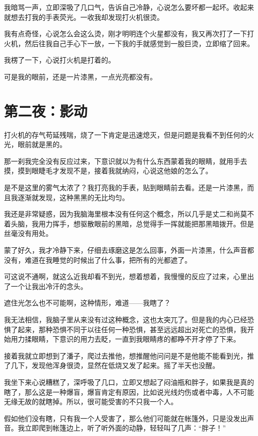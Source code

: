 我暗骂一声，立即深吸了几口气，告诉自己冷静，心说怎么要坏都一起坏。收起来就想去打我的手表荧光。一收我却发现打火机很烫。

我有点奇怪，心说怎么会这么烫，刚才明明连个火星都没有，我又再次打了一下打火机，然后往我自己手心下一放，一下我的手就感觉到一股巨烫，立即缩了回来。

我楞了一下，心说打火机是打着的。

可是我的眼前，还是一片漆黑，一点光亮都没有。

\chapter{第二夜：影动}

打火机的存气苟延残喘，烧了一下肯定是迅速熄灭，但是问题是我看不到任何的火光，眼前就是黑的。

那一刹我完全没有反应过来，下意识就以为有什么东西蒙着我的眼睛，就用手去摸，摸到眼睫毛才发现不是，接着我就纳闷，心说这他娘的怎么了。

是不是这里的雾气太浓了？我打亮我的手表，贴到眼睛前去看。还是一片漆黑，而且我逐渐就发现，这种黑黑的无比均匀。

我还是非常疑惑，因为我脑海里根本没有任何这个概念，所以几乎是丈二和尚莫不着头脑，我用力挥手，想驱散眼前的黑暗，总觉得手一挥就能把那黑暗拨开。但是丝毫没有用处。

蒙了好久，我才冷静下来，仔细去琢磨这是怎么回事，外面一片漆黑，什么声音都没有，难道在我睡觉的时候出了什么事，把所有的光都遮了。

可这说不通啊，就这么近我却看不到光，想着想着，我慢慢的反应了过来，心里出了一个让我出冷汗的念头。

遮住光怎么也不可能啊，这种情形，难道——我瞎了？

我无法相信，我脑子里从来没有过这种概念，这也太突兀了。但是我的内心已经恐惧了起来，那种恐惧不同于以往任何一种恐惧，甚至远远超出对死亡的恐惧，我开始用力揉眼睛，下意识的用力去眨，一直到我眼睛疼的都睁不开才停了下来。

接着我就立即想到了潘子，爬过去推他，想推醒他问问是不是他能不能看到光，推了几下，发现他浑身很烫，显然在低烧又发了起来。摇了半天也没醒。

我坐下来心说糟糕了，深呼吸了几口，立即又想起了闷油瓶和胖子，如果我是真的瞎了，那么这是一种爆盲，爆盲肯定有原因，比如说光线灼伤或者中毒，人不可能无缘无故的就瞎掉。所以，很可能受害的不只我一个人。

假如他们没有瞎，只有我一个人受害了，那么他们可能就在帐篷外，只是没发出声音。我立即爬到帐篷边上，听了听外面的动静，轻轻叫了几声：“胖子！”

